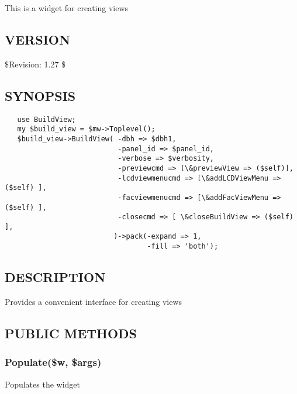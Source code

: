 \documentclass{article}
\begin{document}
This is a widget for creating views

\subsection*{VERSION\label{BuildView_VERSION}}


\$Revision: 1.27 \$

\subsection*{SYNOPSIS\label{BuildView_SYNOPSIS}}
\begin{verbatim}
   use BuildView;
   my $build_view = $mw->Toplevel();
   $build_view->BuildView( -dbh => $dbh1,
                           -panel_id => $panel_id,
                           -verbose => $verbosity,
                           -previewcmd => [\&previewView => ($self)],
                           -lcdviewmenucmd => [\&addLCDViewMenu => ($self) ],
                           -facviewmenucmd => [\&addFacViewMenu => ($self) ],
                           -closecmd => [ \&closeBuildView => ($self) ],
                          )->pack(-expand => 1,
                                  -fill => 'both');
\end{verbatim}
\subsection*{DESCRIPTION\label{BuildView_DESCRIPTION}}


Provides a convenient interface for creating views

\subsection*{PUBLIC METHODS\label{BuildView_PUBLIC_METHODS}}
\subsubsection*{Populate(\$w, \$args)\label{BuildView_Populate_w_args_}}


Populates the widget
\end{document}

